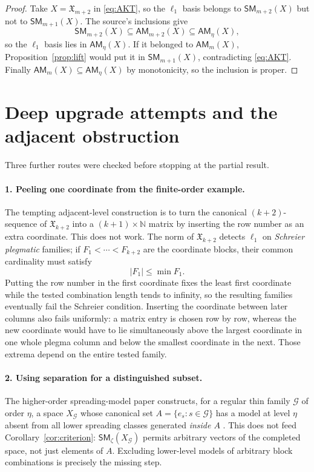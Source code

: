 \documentclass[11pt]{article}
\newcommand{\AM}{\mathsf{AM}}
\newcommand{\SM}{\mathsf{SM}}
\begin{document}
\begin{proof}
Take $X=\mathfrak X_{m+2}$ in \eqref{eq:AKT}, so the $\ell_1$ basis belongs to $\SM_{m+2}(X)$ but not to $\SM_{m+1}(X)$.  The source's inclusions give
\[
 \SM_{m+2}(X)\subseteq\AM_{m+2}(X)\subseteq\AM_\eta(X),
\]
so the $\ell_1$ basis lies in $\AM_\eta(X)$.  If it belonged to $\AM_m(X)$, Proposition~\ref{prop:lift} would put it in $\SM_{m+1}(X)$, contradicting \eqref{eq:AKT}.  Finally $\AM_m(X)\subseteq\AM_\eta(X)$ by monotonicity, so the inclusion is proper.
\end{proof}

\section*{Deep upgrade attempts and the adjacent obstruction}
Three further routes were checked before stopping at the partial result.

\paragraph{1. Peeling one coordinate from the finite-order example.}
The tempting adjacent-level construction is to turn the canonical $(k+2)$-sequence of $\mathfrak X_{k+2}$ into a $(k+1)\times\mathbb N$ matrix by inserting the row number as an extra coordinate.  This does not work.  The norm of $\mathfrak X_{k+2}$ detects $\ell_1$ on \emph{Schreier plegmatic} families; if $F_1<\cdots<F_{k+2}$ are the coordinate blocks, their common cardinality must satisfy
\[
 |F_1|\leq\min F_1.
\]
Putting the row number in the first coordinate fixes the least first coordinate while the tested combination length tends to infinity, so the resulting families eventually fail the Schreier condition.  Inserting the coordinate between later columns also fails uniformly: a matrix entry is chosen row by row, whereas the new coordinate would have to lie simultaneously above the largest coordinate in one whole plegma column and below the smallest coordinate in the next.  Those extrema depend on the entire tested family.

\paragraph{2. Using separation for a distinguished subset.}
The higher-order spreading-model paper constructs, for a regular thin family $\mathcal G$ of order $\eta$, a space $X_{\mathcal G}$ whose canonical set $A=\{e_s:s\in\mathcal G\}$ has a model at level $\eta$ absent from all lower spreading classes generated \emph{inside $A$} \cite{Higher}.  This does not feed Corollary~\ref{cor:criterion}: $\SM_\zeta(X_{\mathcal G})$ permits arbitrary vectors of the completed space, not just elements of $A$.  Excluding lower-level models of arbitrary block combinations is precisely the missing step.
\end{document}
